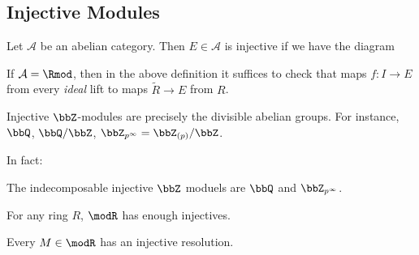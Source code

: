 \documentclass[12pt]{article}
\begin{document}
\subsection{Injective Modules}
\begin{defn}
	Let $\mathcal A$ be an abelian category. Then $E\in \mathcal A$ is injective if we have the diagram
	\begin{center}
	\end{center}
\end{defn}
\begin{lem}
	If $\mathcal A=\Rmod$, then in the above definition it suffices to check that maps $f:I\to E$ from
	every \textit{ideal} lift to maps $\tilde R\to E$ from $R$.
\end{lem}
\begin{ex}
	Injective $\bbZ$-modules are precisely the divisible abelian groups. For instance, $\bbQ$, $\bbQ/\bbZ$, $\bbZ_{p^\infty}=\bbZ_{(p)}/\bbZ$.
\end{ex}
In fact:
\begin{lem}
	The indecomposable injective $\bbZ$ moduels are $\bbQ$ and $\bbZ_{p^\infty}$.
\end{lem}
\begin{thm}
	For any ring $R$, $\modR$ has enough injectives.
\end{thm}
\begin{cor}
	Every $M\in\modR$ has an injective resolution.
\end{cor}
\end{document}
